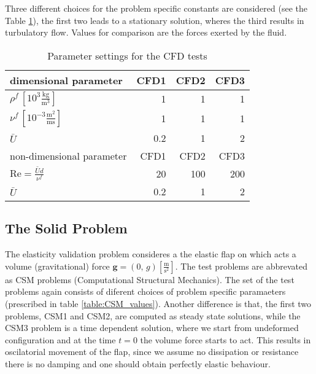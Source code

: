 Three different choices for the problem specific constants are considered (see the Table 
\ref{table:CFD_constants}), the first two
leads to a stationary solution, wheres the third results in turbulatory flow. Values for comparison
are the forces exerted by the fluid.

\begin{table}\label{table:CFD_constants}
\centering
\begin{tabular}{|l|r|r|r|}
  \hline
  dimensional parameter                               & CFD1 & CFD2 & CFD3 \\
  \hline
  $\rho^f\,[10^3 \frac{\mathrm{kg}}{\mathrm{m}^3}]$   &    1 &    1 &    1 \\
  $\nu^f\,[10^{-3} \frac{\mathrm{m}^2}{\mathrm{ms}}]$ &    1 &    1 &    1 \\
  \hline
  $\bar{U}$                                           & 0.2  &    1 &    2 \\
  \hline \hline
  non-dimensional parameter                           & CFD1 & CFD2 & CFD3 \\
  \hline
  $\mathrm{Re} = \frac{\bar{U}d}{\nu^f}$              &   20 &  100 &  200 \\
  $\bar{U}$                                           & 0.2  &    1 &    2 \\
  \hline
\end{tabular}
  \caption{Parameter settings for the CFD tests}
\end{table}


\subsection{The Solid Problem}
The elasticity validation problem consideres a the elastic flap on which acts a volume
(gravitational) force $\mathbf{g} = (0, \,g ) [\frac{\mathrm{m}}{\mathrm{s}^2}]$.
The test problems are abbrevated as CSM problems (Computational Structural Mechanics).
The set of the test problems again consists of diferent choices of problem specific paramaeters
(prescribed in table \ref{table:CSM_values}).
Another difference is that, the first two problems, CSM1 and CSM2, are computed as steady
state solutions, while the CSM3 problem is a time dependent solution, where we start from
undeformed configuration and at the time $t=0$ the volume force starts to act.
This results in oscilatorial movement of the flap, since we assume no dissipation or resistance
there is no damping and one should obtain perfectly elastic behaviour.


